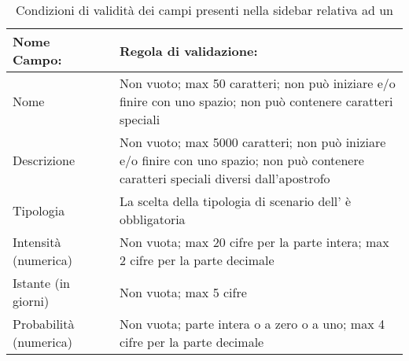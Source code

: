 	\begin{table}[H]
		\centering
		\begin{tabular}{ p{3cm}p{0cm}p{10.5cm}}
			\toprule
			\textbf{Nome Campo:} & & \textbf{Regola di validazione:} \\
			\midrule
			{Nome} & & Non vuoto; max 50 caratteri; non può iniziare e/o finire con uno spazio; non può contenere caratteri speciali
			\\ \hline
			{Descrizione} & & {Non vuoto; max 5000 caratteri; non può iniziare e/o finire con uno spazio; non può contenere caratteri speciali diversi dall'apostrofo}
			\\ \hline
			{Tipologia} & &{La scelta della tipologia di scenario dell'\mglo{Asset}{asset} è obbligatoria}
			\\ \hline
			{Intensità (numerica)} & &{Non vuota; max 20 cifre per la parte intera; max 2 cifre per la parte decimale}
			\\ \hline
			{Istante (in giorni)} & &{Non vuota; max 5 cifre}
			\\ \hline
			{Probabilità (numerica)} & &{Non vuota; parte intera o a zero o a uno; max 4 cifre per la parte decimale}
			\\ \hline
			\end{tabular}
			\caption{Condizioni di validità dei campi presenti nella sidebar relativa ad un  }
		\end{table}

	